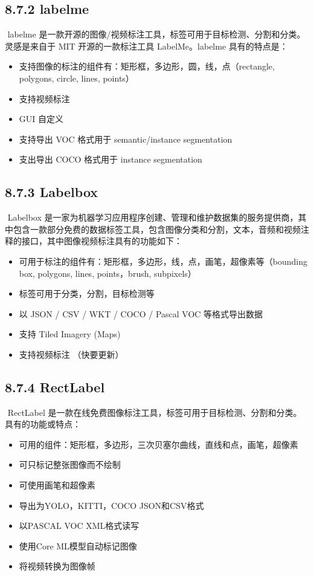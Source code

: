 \subsection{8.7.2 labelme}\label{labelme}

​ labelme
是一款开源的图像/视频标注工具，标签可用于目标检测、分割和分类。灵感是来自于
MIT 开源的一款标注工具 LabelMe。labelme 具有的特点是：

\begin{itemize}
\item
  支持图像的标注的组件有：矩形框，多边形，圆，线，点（rectangle,
  polygons, circle, lines, points）
\item
  支持视频标注
\item
  GUI 自定义
\item
  支持导出 VOC 格式用于 semantic/instance segmentation
\item
  支出导出 COCO 格式用于 instance segmentation
\end{itemize}

\subsection{8.7.3 Labelbox}\label{labelbox}

​ Labelbox
是一家为机器学习应用程序创建、管理和维护数据集的服务提供商，其中包含一款部分免费的数据标签工具，包含图像分类和分割，文本，音频和视频注释的接口，其中图像视频标注具有的功能如下：

\begin{itemize}
\item
  可用于标注的组件有：矩形框，多边形，线，点，画笔，超像素等（bounding
  box, polygons, lines, points，brush, subpixels）
\item
  标签可用于分类，分割，目标检测等
\item
  以 JSON / CSV / WKT / COCO / Pascal VOC 等格式导出数据
\item
  支持 Tiled Imagery (Maps)
\item
  支持视频标注 （快要更新）
\end{itemize}

\subsection{8.7.4 RectLabel}\label{rectlabel}

​ RectLabel
是一款在线免费图像标注工具，标签可用于目标检测、分割和分类。具有的功能或特点：

\begin{itemize}
\item
  可用的组件：矩形框，多边形，三次贝塞尔曲线，直线和点，画笔，超像素
\item
  可只标记整张图像而不绘制
\item
  可使用画笔和超像素
\item
  导出为YOLO，KITTI，COCO JSON和CSV格式
\item
  以PASCAL VOC XML格式读写
\item
  使用Core ML模型自动标记图像
\item
  将视频转换为图像帧
\end{itemize}

